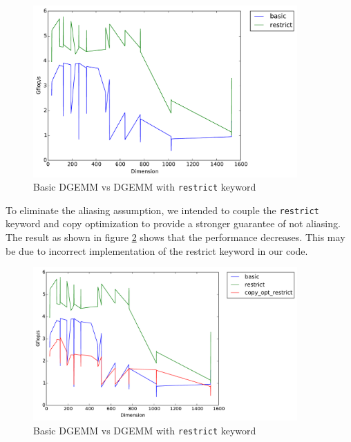 \documentclass[11pt]{article}
\theoremstyle{plain}
\theoremstyle{definition}
\begin{document}
\begin{figure}[H]
    \includegraphics[width=0.9\textwidth]{timing_basic_vs_restrict.pdf}
    \caption{Basic DGEMM vs DGEMM with \texttt{restrict} keyword}
    \label{basic_restrict}
\end{figure} 

To eliminate the aliasing assumption, we intended to couple the \texttt{restrict} keyword and copy optimization to provide a stronger guarantee of not aliasing. The result as shown in figure \ref{restrict_copy_opt} shows that the performance decreases. This may be due to incorrect implementation of the restrict keyword in our code. 

\begin{figure}[H]
    \includegraphics[width=0.9\textwidth]{timing_copy_opt_restrict.pdf}
    \caption{Basic DGEMM vs DGEMM with \texttt{restrict} keyword}
    \label{restrict_copy_opt}
\end{figure} 
\end{document}

